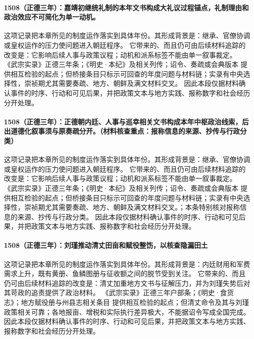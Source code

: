 \paragraph{1508（正德三年）：嘉靖初继统礼制的本年文书构成大礼议过程锚点，礼制理由和政治效应不可简化为单一动机。} 这项记录把本章所见的制度运作落实到具体年份。其形成背景是：继承、官僚协调或皇权运作的压力使问题进入朝廷程序。 它带来的、而且仍可由后续材料追踪的改变是：它影响后续人事与政策议程；动机和派系标签不能由单一叙事裁定。 《武宗实录》正德三年条；《明史·本纪》及相关列传；诏令、奏疏或会典版本 提供相互检验的起点；但桥接条目只标示可回查的年度问题与材料链；实录有中央选择性，崇祯期尤其需要奏疏、地方、朝鲜及满文材料交叉。 因此本段仅据材料确认事件的时序、行动和可见后果，并把政策文本与地方实践、报称数字和社会经历分开处理。

\paragraph{1508（正德三年）：正德朝内廷、人事与巡幸相关文书构成本年中枢政治线索，后出道德化叙事须与原奏疏分开。（材料核查重点：报称信息的来源、抄传与行政分类）} 这项记录把本章所见的制度运作落实到具体年份。其形成背景是：继承、官僚协调或皇权运作的压力使问题进入朝廷程序。 它带来的、而且仍可由后续材料追踪的改变是：它影响后续人事与政策议程；动机和派系标签不能由单一叙事裁定。 《武宗实录》正德三年条；《明史·本纪》及相关列传；诏令、奏疏或会典版本 提供相互检验的起点；但桥接条目只标示可回查的年度问题与材料链；实录有中央选择性，崇祯期尤其需要奏疏、地方、朝鲜及满文材料交叉。；本条特别核对报称信息的来源、抄传与行政分类。 因此本段仅据材料确认事件的时序、行动和可见后果，并把政策文本与地方实践、报称数字和社会经历分开处理。

\paragraph{1508（正德三年）：刘瑾推动清丈田亩和赋役整饬，以核查隐漏田土} 这项记录把本章所见的制度运作落实到具体年份。其形成背景是：内廷财用和军费需求上升，既有黄册、鱼鳞图册与征收额之间的脱节受到关注。 它带来的、而且仍可由后续材料追踪的改变是：清丈加重地方文书与征解压力，并为刘瑾失势后对其苛政的追责提供了政治材料。 《武宗实录》正德三年户部条；《明史·食货志》；地方赋役册与州县志相关条目 提供相互检验的起点；但清丈命令及其与刘瑾政策相关可靠；各地报亩、增税和实际执行差异极大，不能据诏令写成全国完成。 因此本段仅据材料确认事件的时序、行动和可见后果，并把政策文本与地方实践、报称数字和社会经历分开处理。

